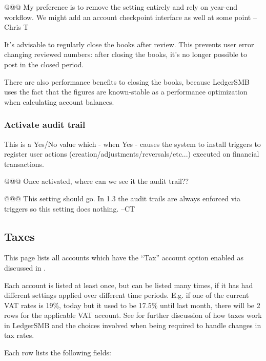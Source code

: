 @@@ My preference is to remove the setting entirely and rely on year-end 
workflow.  We might add an account checkpoint interface as well at some point
--Chris T

It's advisable to regularly close the books after review. This prevents user error changing
reviewed numbers: after closing the books, it's no longer possible to post in the closed
period.

There are also performance benefits to closing the books, because LedgerSMB uses the
fact that the figures are known-stable as a performance optimization when calculating
account balances.

\subsubsection{Activate audit trail}
\label{subsubsec-company-config-audit-control-audit-trail}

This is a Yes/No value which - when Yes - causes the system to install triggers to register
user actions (creation/adjustments/reversals/etc...) executed on financial transactions.


@@@ Once activated, where can we see it the audit trail??

@@@ This setting should go.  In 1.3 the audit trails are always enforced via
triggers so this setting does nothing.  --CT

\subsection{Taxes}
\label{subsec-company-config-taxes}


This page lists all accounts which have the ``Tax'' account option enabled as discussed in .

Each account is listed at least once, but can be listed many times, if it has had different
settings applied over different time periods. E.g. if one of the current VAT rates is 19\%,
today but it used to be 17.5\% until last month, there will be 2 rows for the applicable
VAT account. See  for further discussion of how taxes work in
LedgerSMB and the choices involved when being required to handle changes in tax rates.

Each row lists the following fields:

